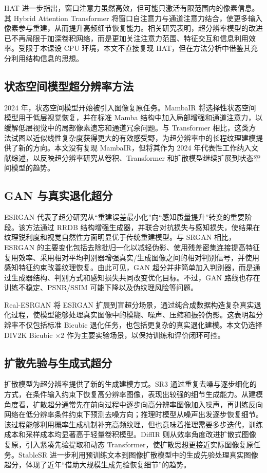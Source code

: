 \documentclass[bwprint]{report}
\begin{document}
HAT 进一步指出，窗口注意力虽然高效，但可能只激活有限范围内的像素信息。其 Hybrid Attention Transformer 将窗口自注意力与通道注意力结合，使更多输入像素参与重建，从而提升高频细节恢复能力\cite{chen2023hat}。相关研究表明，超分辨率模型的改进已不再局限于加深卷积网络，而是更加关注注意力范围、特征交互和信息利用效率。受限于本课设 CPU 环境，本文不直接复现 HAT，但在方法分析中借鉴其充分利用结构信息的思想。

\subsection{状态空间模型超分辨率方法}
2024 年，状态空间模型开始被引入图像复原任务。MambaIR 将选择性状态空间模型用于低层视觉恢复，并在标准 Mamba 结构中加入局部增强和通道注意力，以缓解低层视觉中的局部像素遗忘和通道冗余问题\cite{guo2024mambair}。与 Transformer 相比，这类方法试图以近似线性复杂度获得更大的有效感受野，为超分辨率中的长程纹理建模提供了新的方向。本文没有复现 MambaIR，但将其作为 2024 年代表性工作纳入文献综述，以反映超分辨率研究从卷积、Transformer 和扩散模型继续扩展到状态空间模型的趋势。

\subsection{GAN 与真实退化超分}
ESRGAN 代表了超分研究从“重建误差最小化”向“感知质量提升”转变的重要阶段。该方法通过 RRDB 结构增强生成器，并联合对抗损失与感知损失，使结果在纹理锐利度和视觉自然性方面明显优于传统重建模型\cite{wang2018esrgan}。与 SRGAN 相比，ESRGAN 的主要变化包括去除批归一化以减轻伪影、使用残差密集连接提高特征复用效率、采用相对平均判别器增强真实/生成图像之间的相对判别信号，并使用感知特征约束改善纹理恢复。由此可见，GAN 超分并非简单加入判别器，而是通过生成器结构、判别方式和感知损失共同改变优化目标。不过，GAN 路线也存在训练不稳定、PSNR/SSIM 可能下降以及伪纹理风险等问题。

Real-ESRGAN 将 ESRGAN 扩展到盲超分场景，通过纯合成数据构造复杂真实退化过程，使模型能够处理真实图像中的模糊、噪声、压缩和振铃伪影\cite{wang2021realesrgan}。这表明超分辨率不仅包括标准 Bicubic 退化任务，也包括更复杂的真实退化建模。本文仍选择 DIV2K Bicubic $\times 2$ 作为主要实验场景，以保持训练和评价闭环可控。

\subsection{扩散先验与生成式超分}
扩散模型为超分辨率提供了新的生成建模方式。SR3 通过重复去噪与逐步细化的方式，在条件输入约束下恢复高分辨率图像，表现出较强的细节生成能力\cite{saharia2021sr3}。从建模角度看，扩散超分通常先在前向过程中逐步向高分辨率图像加入噪声，再训练反向网络在低分辨率条件约束下预测去噪方向；推理时模型从噪声出发逐步恢复细节。该过程能够利用概率生成机制补充高频纹理，但也意味着推理需要多步迭代，训练成本和采样成本均显著高于轻量卷积模型。DiffIR 则从效率角度改进扩散式图像复原，引入紧凑先验提取和动态 Transformer，使扩散思想更接近实际图像复原任务\cite{xia2023diffir}。StableSR 进一步利用预训练文本到图像扩散模型中的生成先验处理真实图像超分\cite{wang2023stablesr}，体现了近年“借助大规模生成先验恢复细节”的趋势。
\end{document}
